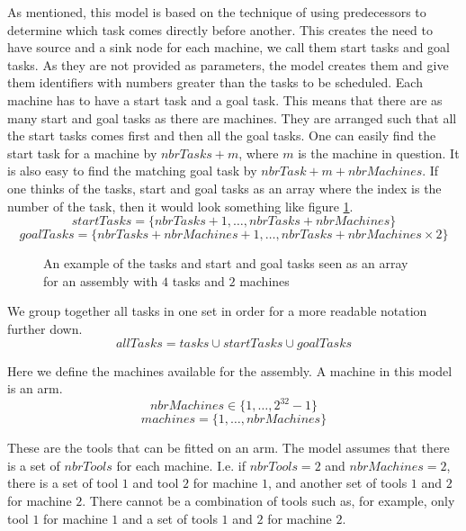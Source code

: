   \noindent As mentioned, this model is based on the technique of using predecessors to determine which task comes directly before another. This creates the need to have source and a sink node for each machine, we call them start tasks and goal tasks. As they are not provided as parameters, the model creates them and give them identifiers with numbers greater than the tasks to be scheduled. Each machine has to have a start task and a goal task. This means that there are as many start and goal tasks as there are machines. They are arranged such that all the start tasks comes first and then all the goal tasks. One can easily find the start task for a machine by $nbrTasks + m$, where $m$ is the machine in question. It is also easy to find the matching goal task by $nbrTask + m + nbrMachines$. If one thinks of the tasks, start and goal tasks as an array where the index is the number of the task, then it would look something like figure \ref{fig:tasks_array}.
 \begin{equation}\label{eq:19}
 startTasks = \{nbrTasks+1 , \ldots , nbrTasks+nbrMachines\}
 \end{equation}
 \begin{equation}\label{eq:20}
 goalTasks = \{nbrTasks+nbrMachines+1 , \ldots , nbrTasks+nbrMachines \times 2\}
 \end{equation}

\begin{figure}
	\centering
	
	\caption{An example of the tasks and start and goal tasks seen as an array for an assembly with $4$ tasks and $2$ machines}
	\label{fig:tasks_array}
\end{figure}

\noindent We group together all tasks in one set in order for a more readable notation further down.
 \begin{equation}\label{eq:21}
 allTasks = tasks \cup startTasks \cup goalTasks
 \end{equation}

  \noindent Here we define the machines available for the assembly. A machine in this model is an arm.
 \begin{equation}\label{eq:2}
 nbrMachines \in \{1 , \ldots , 2^{32}-1\}
 \end{equation}
 \begin{equation}\label{eq:11}
 machines = \{1 , \ldots , nbrMachines\}
 \end{equation}

  \noindent These are the tools that can be fitted on an arm. The model assumes that there is a set of $nbrTools$ for each machine. I.e. if $nbrTools = 2$ and $nbrMachines = 2$, there is a set of tool $1$ and tool $2$ for machine $1$, and another set of tools $1$ and $2$ for machine $2$. There cannot be a combination of tools such as, for example, only tool $1$ for machine $1$ and a set of tools $1$ and $2$ for machine $2$.
 
